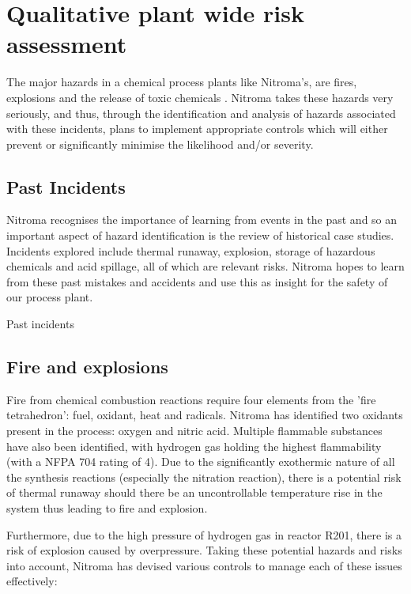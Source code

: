 \section{Qualitative plant wide risk assessment}

The major hazards in a chemical process plants like Nitroma’s, are fires, explosions and the release of toxic chemicals \cite{mannan_lees_2012}. Nitroma takes these hazards very seriously, and thus, through the identification and analysis of hazards associated with these incidents, plans to implement appropriate controls which will either prevent or significantly minimise the likelihood and/or severity. 


\subsection{Past Incidents}

Nitroma recognises the importance of learning from events in the past and so an important aspect of hazard identification is the review of historical case studies. Incidents explored include thermal runaway, explosion, storage of hazardous chemicals and acid spillage, all of which are relevant risks. Nitroma hopes to learn from these past mistakes and accidents and use this as insight for the safety of our process plant.

\begin{table}[h]
    \caption{Past incidents}
    
\end{table}

\subsection{Fire and explosions}

Fire from chemical combustion reactions require four elements from the 'fire tetrahedron': fuel, oxidant, heat and radicals. Nitroma has identified two oxidants present in the process: oxygen and nitric acid. Multiple flammable substances have also been identified, with hydrogen gas holding the highest flammability (with a NFPA 704 rating of 4). Due to the significantly exothermic nature of all the synthesis reactions (especially the nitration reaction), there is a potential risk of thermal runaway should there be an uncontrollable temperature rise in the system thus leading to fire and explosion.

Furthermore, due to the high pressure of hydrogen gas in reactor R201, there is a risk of explosion caused by overpressure. Taking these potential hazards and risks into account, Nitroma has devised various controls to manage each of these issues effectively: 


